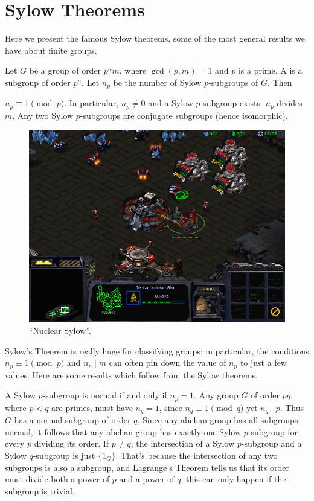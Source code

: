 \section{Sylow Theorems}
Here we present the famous Sylow theorems, some of the most
general results we have about finite groups.

\begin{theorem}
	Let $G$ be a group of order $p^n m$,
	where $\gcd(p,m)=1$ and $p$ is a prime.
	A  is a subgroup of order $p^n$.
	Let $n_p$ be the number of Sylow $p$-subgroups of $G$.
	Then
	\begin{enumerate}[(a)]
		\ii $n_p \equiv 1 \pmod p$. In particular, $n_p \neq 0$ and
		a Sylow $p$-subgroup exists.
		\ii $n_p$ divides $m$.
		\ii Any two Sylow $p$-subgroups are conjugate subgroups (hence isomorphic).
	\end{enumerate}
\end{theorem}

\begin{figure}[ht]
	\centering
	\includegraphics[scale=0.6]{media/starcraft-nuclear-silo.png}
	\caption{``Nuclear Sylow''.}
\end{figure}


Sylow's Theorem is really huge for classifying groups;
in particular, the conditions $n_p \equiv 1 \pmod p$ and $n_p \mid m$
can often pin down the value of $n_p$ to just a few values.
Here are some results which follow from the Sylow theorems.
\begin{itemize}
	\ii A Sylow $p$-subgroup is normal if and only if $n_p = 1$.
	\ii Any group $G$ of order $pq$, where $p < q$ are primes,
	must have $n_q = 1$, since $n_q \equiv 1 \pmod q$ yet $n_q \mid p$.
	Thus $G$ has a normal subgroup of order $q$.
	\ii Since any abelian group has all subgroups normal,
	it follows that any abelian group has exactly one Sylow $p$-subgroup
	for every $p$ dividing its order.
	\ii If $p \neq q$, the intersection of a Sylow $p$-subgroup and a Sylow $q$-subgroup is just $\{1_G\}$.
	That's because the intersection of any two subgroups is also a subgroup,
	and Lagrange's Theorem tells us that its order must divide both a power of $p$
	and a power of $q$; this can only happen if the subgroup is trivial.
\end{itemize}

